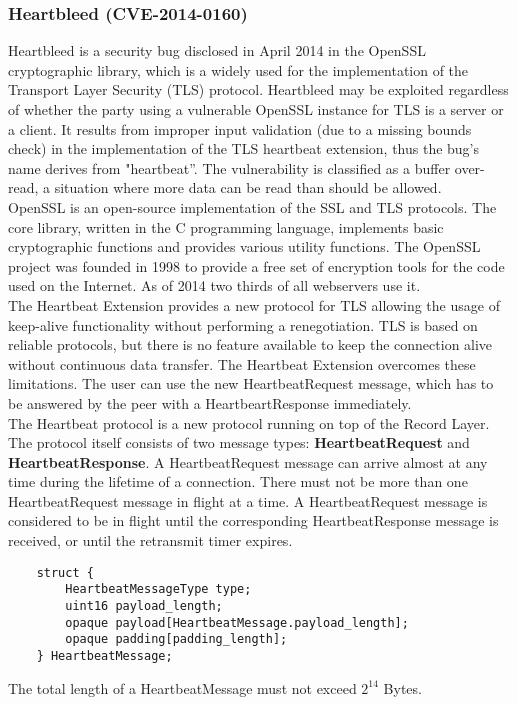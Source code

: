 \documentclass[a4paper, 10pt, titlepage]{article}
\begin{document}
\subsubsection{Heartbleed (CVE-2014-0160)}
Heartbleed is a security bug disclosed in April 2014 in the OpenSSL cryptographic library, which is a widely used for the implementation of the Transport Layer Security (TLS) protocol.
Heartbleed may be exploited regardless of whether the party using a vulnerable OpenSSL instance for TLS is a server or a client. It results from improper input validation (due to a missing bounds check) in the implementation of the TLS heartbeat extension, thus the bug's name derives from "heartbeat”. The vulnerability is classified as a buffer over-read, a situation where more data can be read than should be allowed. \medskip\\
OpenSSL is an open-source implementation of the SSL and TLS protocols. The core library, written in the C programming language, implements basic cryptographic functions and provides various utility functions. The OpenSSL project was founded in 1998 to provide a free set of encryption tools for the code used on the Internet. As of 2014 two thirds of all webservers use it. \medskip\\
The Heartbeat Extension provides a new protocol for TLS allowing the usage of keep-alive functionality without performing a renegotiation. TLS is based on reliable protocols, but there is no feature available to keep the connection alive without continuous data transfer. The Heartbeat Extension overcomes these limitations. The user can use the new HeartbeatRequest message, which has to be answered by the peer with a HeartbeartResponse immediately. \\
The Heartbeat protocol is a new protocol running on top of the Record Layer. The protocol itself consists of two message types: \textbf{HeartbeatRequest} and \textbf{HeartbeatResponse}. A HeartbeatRequest message can arrive almost at any time during the lifetime of a connection. There must not be more than one HeartbeatRequest message in flight at a time. A HeartbeatRequest message is considered to be in flight until the corresponding HeartbeatResponse message is received, or until the retransmit timer expires.
\begin{lstlisting}
	struct {
		HeartbeatMessageType type;
		uint16 payload_length;
		opaque payload[HeartbeatMessage.payload_length];
		opaque padding[padding_length];
	} HeartbeatMessage;
\end{lstlisting}
The total length of a HeartbeatMessage must not exceed $2^{14}$ Bytes.
\end{document}
